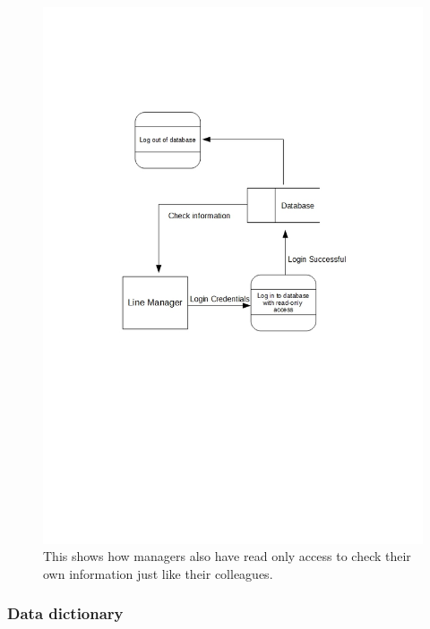 \begin{figure}[H]
\includegraphics[width=\textwidth]{DFDLoginManager.jpg}
\caption{This shows how managers also have read only access to check their own information just like their colleagues.} \label{Page1Interview}
\end{figure}

\subsubsection{Data dictionary}


